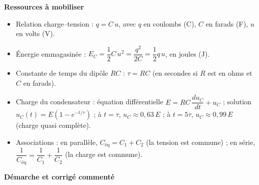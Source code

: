 \documentclass[11pt]{article}
\begin{document}
\textbf{Ressources à mobiliser}\par

\begin{itemize}
\item Relation charge--tension : $q = C\,u$, avec $q$ en coulombs (C), $C$ en farads (F), $u$ en volts (V).
\item Énergie emmagasinée : $E_C = \dfrac{1}{2}C\,u^2 = \dfrac{q^2}{2C} = \dfrac{1}{2}q\,u$, en joules (J).
\item Constante de temps du dipôle $RC$ : $\tau = RC$ (en secondes si $R$ est en ohms et $C$ en farads).
\item Charge du condensateur : équation différentielle $E = RC\,\dfrac{du_C}{dt} + u_C$ ; solution $u_C(t) = E\left(1 - e^{-t/\tau}\right)$ ; à $t = \tau$, $u_C \approx 0{,}63\,E$ ; à $t = 5\tau$, $u_C \approx 0{,}99\,E$ (charge quasi complète).
\item Associations : en parallèle, $C_{\text{éq}} = C_1 + C_2$ (la tension est commune) ; en série, $\dfrac{1}{C_{\text{éq}}} = \dfrac{1}{C_1} + \dfrac{1}{C_2}$ (la charge est commune).
\end{itemize}

\textbf{Démarche et corrigé commenté}\par
\end{document}
